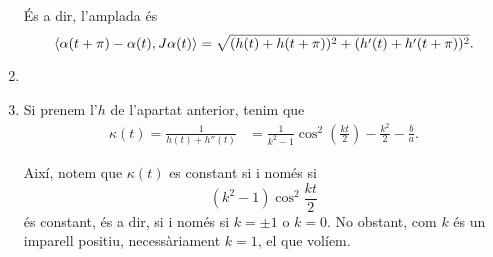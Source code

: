 \documentclass[a4paper, 11pt]{article}
\begin{document}
\begin{solution}
\begin{enumerate}[label=(\alph*)]
\begin{center}
      \end{center}

      És a dir, l'amplada és
      \[
        \left\langle\alpha(t + \pi) - \alpha(t), J \alpha(t)\right\rangle =
        \sqrt{(h(t) + h(t + \pi))^2 + (h'(t) + h'(t + \pi))^2}.
      \]
      \item
      \item Si prenem l'$h$ de l'apartat anterior, tenim que
      \[
        \begin{split}
          \kappa(t) = \frac{1}{h(t) + h''(t)}
          &= \frac{1}{k^2 - 1}\cos^2 \left(\frac{kt}{2}\right)
          - \frac{k^2}{2} - \frac{b}{a}.
        \end{split}
      \]
      
      Així, notem que $\kappa(t)$ es constant si i només si
      \[
        (k^2 - 1) \cos^2 \frac{kt}{2}
      \]
      és constant, és a dir, si i només si $k = \pm 1$ o $k = 0$. No obstant, com
      $k$ és un imparell positiu, necessàriament $k = 1$, el que volíem.
    \end{enumerate}
  \end{solution}
\end{document}
